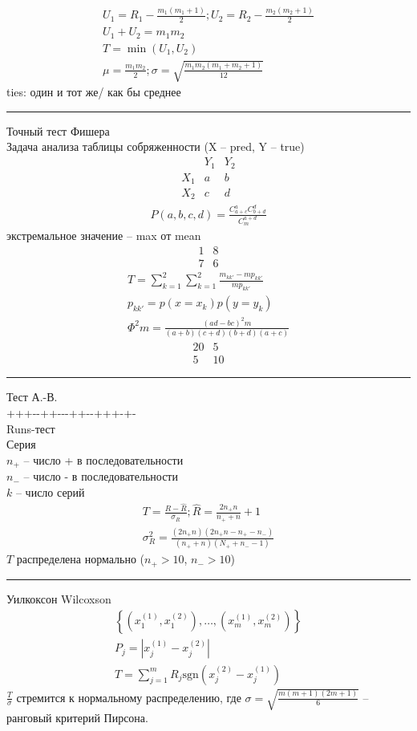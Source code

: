 \documentclass{book}
\begin{document}
\begin{gather*}
  U_1=R_1-\frac{m_1(m_1+1)}{2}; U_2=R_2-\frac{m_2(m_2+1)}{2}\\
  U_1+U_2=m_1m_2\\
  T=\min(U_1,U_2)\\
  \mu=\frac{m_1m_2}{2}; \sigma=\sqrt{\frac{m_1m_2(m_1+m_2+1)}{12}}
\end{gather*}
ties: один и тот же/ как бы среднее
\hrule
Точный тест Фишера\\
Задача анализа таблицы собряженности (X -- pred, Y -- true)\\
\[
\begin{matrix}
  &Y_1&Y_2\\
  X_1&a&b\\
  X_2&c&d
\end{matrix}
\]
\begin{gather*}
  P(a, b, c, d) = \frac{C_{a+c}^{a}C_{b+d}^{d}}{C_{m}^{a+d}}
\end{gather*}
экстремальное значение -- max от mean
\[
\begin{matrix}
  1&8\\
  7&6
\end{matrix}
\]
\begin{gather*}
  T=\sum_{k=1}^{2} {\sum_{k=1}^{2} {\frac{m_{kk'}-mp_{kk'}}{mp_{kk'}}}}\\
  p_{kk'}=p(x=x_k)p(y=y_k)\\
  \Phi^2m=\frac{(ad-bc)^2m}{(a+b)(c+d)(b+d)(a+c)}
\end{gather*}
\[
\begin{matrix}
  20&5\\
  5&10
\end{matrix}
\]
\hrule
Тест А.-В.\\
+++-{}-++-{}-{}-++-{}-+++-+{}-\\
Runs-тест\\
Серия\\
$n_+$ -- число + в последовательности\\
$n_-$ -- число - в последовательности\\
$k$ -- число серий\\
\begin{gather*}
  T = \frac{R-\hat{R}}{\sigma_R}; \hat{R}=\frac{2n_+n}{n_++n}+1\\
  \sigma_R^2=\frac{(2n_+n)(2n_+n-n_+-n_-)}{(n_++n)(N_++n_--1)}
\end{gather*}
$T$ распределена нормально ($n_+>10$, $n_->10$)\\
\hrule
Уилкоксон Wilcoxson\\
\begin{gather*}
  \left\{\left(x_1^{(1)},x_1^{(2)}\right), \dots, \left(x_m^{(1)}, x_m^{(2)}\right)\right\}\\
  P_j=|x_j^{(1)}-x_j^{(2)}|\\
  T=\sum_{j=1}^{m} {R_j \mathrm{sgn}(x_j^{(2)}-x_j^{(1)})}
\end{gather*}
$\frac{T}{\sigma}$ стремится к нормальному распределению, где $\sigma=\sqrt{\frac{m(m+1)(2m+1)}{6}}$ -- ранговый критерий Пирсона.
\end{document}
